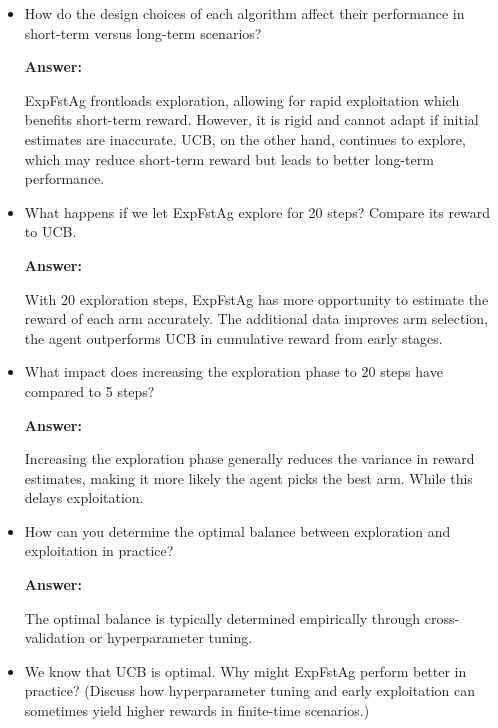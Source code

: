 \documentclass[12pt]{article}
\begin{document}
{{{\begin{itemize}
\begin{itemize}
        \textbf{Answer:}
        
        If the optimal arm can be identified reliably with a small number of exploratory samples, the Explore-First Agent (ExpFstAg) may quickly lock onto it and outperform UCB in terms of cumulative reward. This often happens in environments where the differences between arm rewards are large and noise is low.

        \item How do the design choices of each algorithm affect their performance in short-term versus long-term scenarios?

        \textbf{Answer:}
        
        ExpFstAg frontloads exploration, allowing for rapid exploitation which benefits short-term reward. However, it is rigid and cannot adapt if initial estimates are inaccurate. UCB, on the other hand, continues to explore, which may reduce short-term reward but leads to better long-term performance.

        \item What happens if we let ExpFstAg explore for 20 steps? Compare its reward to UCB.

        \textbf{Answer:}

        With 20 exploration steps, ExpFstAg has more opportunity to estimate the reward of each arm accurately. The additional data improves arm selection, the agent outperforms UCB in cumulative reward from early stages.
                
        \item What impact does increasing the exploration phase to 20 steps have compared to 5 steps?

        \textbf{Answer:}

        Increasing the exploration phase generally reduces the variance in reward estimates, making it more likely the agent picks the best arm. While this delays exploitation.

        \item How can you determine the optimal balance between exploration and exploitation in practice?

        \textbf{Answer:}

        The optimal balance is typically determined empirically through cross-validation or hyperparameter tuning.
        
        \item We know that UCB is optimal. Why might ExpFstAg perform better in practice? (Discuss how hyperparameter tuning and early exploitation can sometimes yield higher rewards in finite-time scenarios.)


\end{itemize}
\end{itemize}}}}
\end{document}
